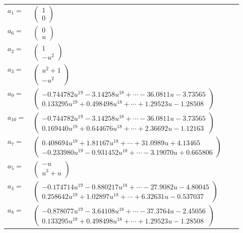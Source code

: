 \documentclass[1p]{elsarticle_modified}
\theoremstyle{definition}
\begin{document}
\begin{tabular}{m{7pt} m{180pt} m{7pt} m{180pt} }
\flushright $a_{1}=$&$\begin{pmatrix}1\\0\end{pmatrix}$ \\
\flushright $a_{6}=$&$\begin{pmatrix}0\\u\end{pmatrix}$ \\
\flushright $a_{2}=$&$\begin{pmatrix}1\\- u^2\end{pmatrix}$ \\
\flushright $a_{3}=$&$\begin{pmatrix}u^2+1\\- u^2\end{pmatrix}$ \\
\flushright $a_{9}=$&$\begin{pmatrix}-0.744782 u^{19}-3.14258 u^{18}+\cdots-36.0811 u-3.73565\\0.133295 u^{19}+0.498498 u^{18}+\cdots+1.29523 u-1.28508\end{pmatrix}$ \\
\flushright $a_{10}=$&$\begin{pmatrix}-0.744782 u^{19}-3.14258 u^{18}+\cdots-36.0811 u-3.73565\\0.169440 u^{19}+0.644676 u^{18}+\cdots+2.36692 u-1.12163\end{pmatrix}$ \\
\flushright $a_{7}=$&$\begin{pmatrix}0.408694 u^{19}+1.81167 u^{18}+\cdots+31.0989 u+4.13465\\-0.233980 u^{19}-0.931452 u^{18}+\cdots-3.19070 u+0.665806\end{pmatrix}$ \\
\flushright $a_{5}=$&$\begin{pmatrix}- u\\u^3+u\end{pmatrix}$ \\
\flushright $a_{4}=$&$\begin{pmatrix}-0.174714 u^{19}-0.880217 u^{18}+\cdots-27.9082 u-4.80045\\0.258642 u^{19}+1.02897 u^{18}+\cdots+6.32631 u-0.537037\end{pmatrix}$ \\
\flushright $a_{8}=$&$\begin{pmatrix}-0.878077 u^{19}-3.64108 u^{18}+\cdots-37.3764 u-2.45056\\0.133295 u^{19}+0.498498 u^{18}+\cdots+1.29523 u-1.28508\end{pmatrix}$ \\

\end{tabular}
\end{document}
